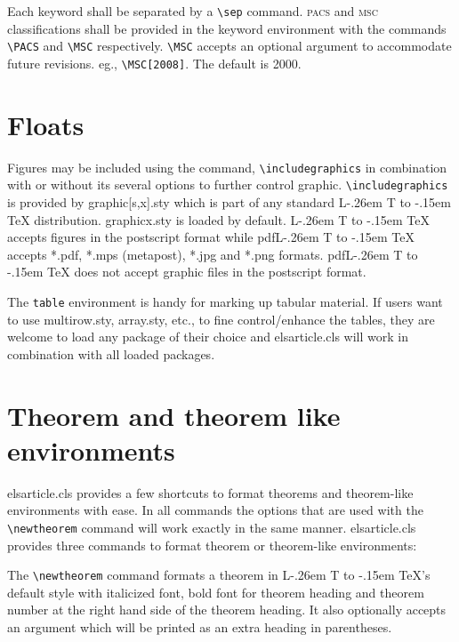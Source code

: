 \documentclass[a4paper,12pt]{article}
\makeatletter
\def\file#1{\textsf{#1}\xspace}
\DeclareRobustCommand{\LaTeX}{L\kern-.26em%
        {\sbox\z@ T%
         \vbox to\ht\z@{\hbox{\check@mathfonts
           \fontsize\sf@size\z@
           \math@fontsfalse\selectfont
          A\,}%
         \vss}%
        }%
     \kern-.15em%
    \TeX}
\makeatother
\begin{document}
\noindent Each keyword shall be separated by a \verb+\sep+ command.
\textsc{pacs} and \textsc{msc} classifications shall be provided in 
the keyword environment with the commands \verb+\PACS+ and
\verb+\MSC+ respectively.  \verb+\MSC+ accepts an optional
argument to accommodate future revisions.
eg., \verb=\MSC[2008]=. The default is 2000.


\section{Floats}
{Figures} may be included using the command, \verb+\includegraphics+ in
combination with or without its several options to further control
graphic. \verb+\includegraphics+ is provided by \file{graphic[s,x].sty}
which is part of any standard \LaTeX{} distribution.
\file{graphicx.sty} is loaded by default. \LaTeX{} accepts figures in
the postscript format while pdf\LaTeX{} accepts \file{*.pdf},
\file{*.mps} (metapost), \file{*.jpg} and \file{*.png} formats. 
pdf\LaTeX{} does not accept graphic files in the postscript format. 

The \verb+table+ environment is handy for marking up tabular
material. If users want to use \file{multirow.sty},
\file{array.sty}, etc., to fine control/enhance the tables, they
are welcome to load any package of their choice and
\file{elsarticle.cls} will work in combination with all loaded
packages.

\section[Theorem and ...]{Theorem and theorem like environments}

\file{elsarticle.cls} provides a few shortcuts to format theorems and
theorem-like environments with ease. In all commands the options that
are used with the \verb+\newtheorem+ command will work exactly in the same
manner. \file{elsarticle.cls} provides three commands to format theorem or
theorem-like environments: 

\begin{vquote}
 \newtheorem{thm}{Theorem}
 \newtheorem{lem}[thm]{Lemma}
\end{vquote}

The \verb+\newtheorem+ command formats a
theorem in \LaTeX's default style with italicized font, bold font
for theorem heading and theorem number at the right hand side of the
theorem heading.  It also optionally accepts an argument which
will be printed as an extra heading in parentheses. 
\end{document}
